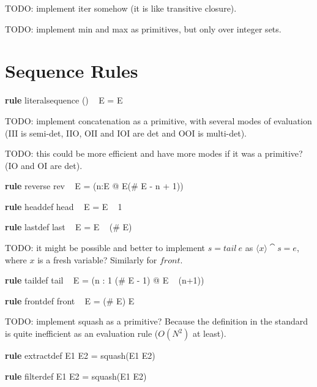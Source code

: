 \documentclass{article}
\newenvironment{zedrule}[1]{\par\textbf{rule }#1\vspace{-1ex}\infrule}{\endinfrule}
\begin{document}
TODO: implement iter somehow (it is like transitive closure).

TODO: implement min and max as primitives, but only over integer sets.


\section{Sequence Rules}

\begin{zedrule}{literalsequence}
   (\langle \listarg \rangle) ~ E = E
\end{zedrule}

TODO: implement concatenation as a primitive, with several
modes of evaluation (III is semi-det, IIO, OII and IOI are det
and OOI is multi-det).

TODO: this could be more efficient and have more modes if it
was a primitive? (IO and OI are det).
\begin{zedrule}{reverse}
   rev ~ E = (\lambda n:\dom E @ E(\# E - n + 1))
\end{zedrule}

\begin{zedrule}{headdef}
   head ~ E = E ~ 1
\end{zedrule}

\begin{zedrule}{lastdef}
   last ~ E = E ~ (\# E)
\end{zedrule}

TODO: it might be possible and better to implement $s=tail~e$
as $\langle x \rangle \cat s = e$, where $x$ is a fresh variable?
Similarly for $front$.
\begin{zedrule}{taildef}
   tail ~ E = (\lambda n : 1 \upto (\# E - 1) @ E ~ (n+1))
\end{zedrule}

\begin{zedrule}{frontdef}
   front ~ E = (\# E) \ndres E
\end{zedrule}

TODO: implement squash as a primitive?
Because the definition in the standard is quite inefficient as
an evaluation rule ($O(N^2)$ at least). 

\begin{zedrule}{extractdef}
   E1 \extract E2 = squash(E1 \dres E2)
\end{zedrule}

\begin{zedrule}{filterdef}
   E1 \filter E2 = squash(E1 \rres E2)
\end{zedrule}
\end{document}
